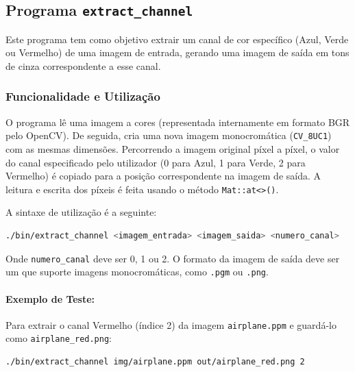 \documentclass[a4paper, 11pt, portuguese]{article}
\begin{document}
\subsection{Programa \texttt{extract\_channel}}

Este programa tem como objetivo extrair um canal de cor específico (Azul, Verde ou Vermelho) de uma imagem de entrada, gerando uma imagem de saída em tons de cinza correspondente a esse canal.

\subsubsection{Funcionalidade e Utilização}
O programa lê uma imagem a cores (representada internamente em formato BGR pelo OpenCV). De seguida, cria uma nova imagem monocromática (\texttt{CV\_8UC1}) com as mesmas dimensões. Percorrendo a imagem original píxel a píxel, o valor do canal especificado pelo utilizador (0 para Azul, 1 para Verde, 2 para Vermelho) é copiado para a posição correspondente na imagem de saída. A leitura e escrita dos píxeis é feita usando o método \texttt{Mat::at<>()}.

A sintaxe de utilização é a seguinte:
\begin{lstlisting}[language=bash, caption=Sintaxe de Uso do extract\_channel]
./bin/extract_channel <imagem_entrada> <imagem_saida> <numero_canal>
\end{lstlisting}
Onde \texttt{numero\_canal} deve ser 0, 1 ou 2. O formato da imagem de saída deve ser um que suporte imagens monocromáticas, como \texttt{.pgm} ou \texttt{.png}.

\paragraph{Exemplo de Teste:}
Para extrair o canal Vermelho (índice 2) da imagem \texttt{airplane.ppm} e guardá-lo como \texttt{airplane\_red.png}:
\begin{lstlisting}[language=bash]
./bin/extract_channel img/airplane.ppm out/airplane_red.png 2
\end{lstlisting}

\end{document}

